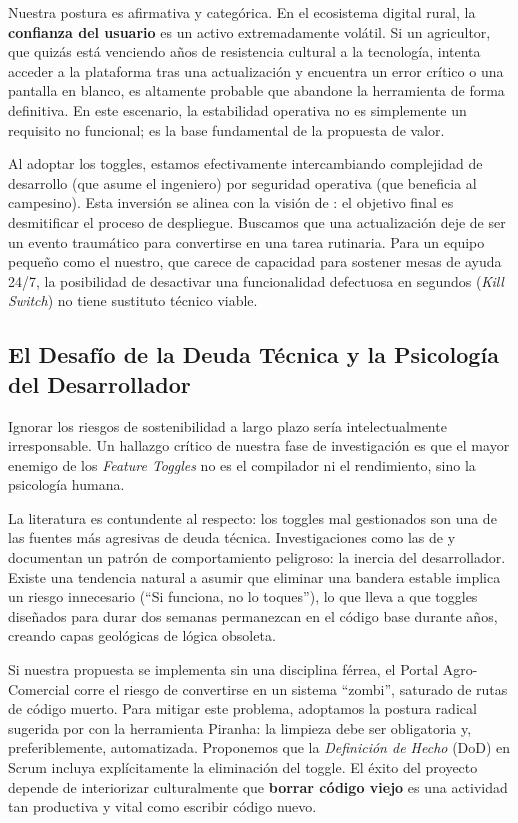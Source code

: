 Nuestra postura es afirmativa y categórica. En el ecosistema digital rural, la \textbf{confianza del usuario} es un activo extremadamente volátil. Si un agricultor, que quizás está venciendo años de resistencia cultural a la tecnología, intenta acceder a la plataforma tras una actualización y encuentra un error crítico o una pantalla en blanco, es altamente probable que abandone la herramienta de forma definitiva. En este escenario, la estabilidad operativa no es simplemente un requisito no funcional; es la base fundamental de la propuesta de valor.

Al adoptar los toggles, estamos efectivamente intercambiando complejidad de desarrollo (que asume el ingeniero) por seguridad operativa (que beneficia al campesino). Esta inversión se alinea con la visión de \cite{rahman2016msr}: el objetivo final es desmitificar el proceso de despliegue. Buscamos que una actualización deje de ser un evento traumático para convertirse en una tarea rutinaria. Para un equipo pequeño como el nuestro, que carece de capacidad para sostener mesas de ayuda 24/7, la posibilidad de desactivar una funcionalidad defectuosa en segundos (\textit{Kill Switch}) no tiene sustituto técnico viable.

\subsection{El Desafío de la Deuda Técnica y la Psicología del Desarrollador}

Ignorar los riesgos de sostenibilidad a largo plazo sería intelectualmente irresponsable. Un hallazgo crítico de nuestra fase de investigación es que el mayor enemigo de los \textit{Feature Toggles} no es el compilador ni el rendimiento, sino la psicología humana.

La literatura es contundente al respecto: los toggles mal gestionados son una de las fuentes más agresivas de deuda técnica. Investigaciones como las de \cite{ortiz2021toggledebt} y \cite{abdalkareem2021removal} documentan un patrón de comportamiento peligroso: la inercia del desarrollador. Existe una tendencia natural a asumir que eliminar una bandera estable implica un riesgo innecesario (``Si funciona, no lo toques''), lo que lleva a que toggles diseñados para durar dos semanas permanezcan en el código base durante años, creando capas geológicas de lógica obsoleta.

Si nuestra propuesta se implementa sin una disciplina férrea, el Portal Agro-Comercial corre el riesgo de convertirse en un sistema ``zombi'', saturado de rutas de código muerto. Para mitigar este problema, adoptamos la postura radical sugerida por \cite{sridharan2020piranha} con la herramienta Piranha: la limpieza debe ser obligatoria y, preferiblemente, automatizada. Proponemos que la \textit{Definición de Hecho} (DoD) en Scrum incluya explícitamente la eliminación del toggle. El éxito del proyecto depende de interiorizar culturalmente que \textbf{borrar código viejo} es una actividad tan productiva y vital como escribir código nuevo.

